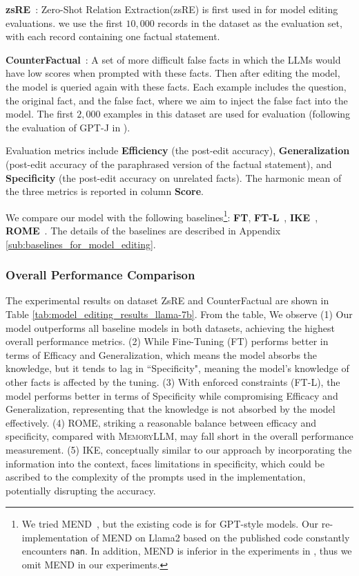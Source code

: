 \documentclass{article}
\theoremstyle{plain}
\theoremstyle{definition}
\theoremstyle{remark}
\newcommand{\ours}{\textsc{MemoryLLM}\xspace}
\begin{document}
\textbf{zsRE}~\citep{zsre}: Zero-Shot Relation Extraction(zsRE) is first used in \citet{mend, KE} for model editing evaluations.  we use the first $10,000$ records in the dataset as the evaluation set, with each record containing one factual statement. 

\textbf{CounterFactual}~\citep{ROME}: A set of more difficult false facts in which the LLMs would have low scores when prompted with these facts. Then after editing the model, the model is queried again with these facts. Each example includes the question, the original fact, and the false fact, where we aim to inject the false fact into the model. The first $2,000$ examples in this dataset are used for evaluation (following the evaluation of GPT-J in \cite{ROME}). 

Evaluation metrics include \textbf{Efficiency} (the post-edit accuracy), \textbf{Generalization} (post-edit accuracy of the paraphrased version of the factual statement), and \textbf{Specificity} (the post-edit accuracy on unrelated facts). The harmonic mean of the three metrics is reported in column \textbf{ Score}. 

We compare our model with the following baselines\footnote{We tried MEND~\citep{mend}, but the existing code is for GPT-style models. Our re-implementation of MEND on Llama2 based on the published code constantly encounters \texttt{nan}. In addition, MEND is inferior in the experiments in \cite{ROME}, thus we omit MEND in our experiments. }:
\textbf{FT}, \textbf{FT-L}~\citep{ModifyingMemories}, \textbf{IKE}~\citep{ike}, \textbf{ROME}~\citep{ROME}. The details of the baselines are described in Appendix \ref{sub:baselines_for_model_editing}. 







\vspace{-5pt}
\subsubsection{Overall Performance Comparison}
The experimental results on dataset ZsRE and CounterFactual are shown in
Table \ref{tab:model_editing_results_llama-7b}. From the table, 
We observe (1) 
Our model outperforms all baseline models in both datasets, achieving the highest overall performance metrics. 
(2) While Fine-Tuning (FT) 
performs better in terms of Efficacy and Generalization, which means the model absorbs the knowledge, but it tends to lag in ``Specificity", meaning the model's knowledge of other facts is affected by the tuning.
(3) With enforced constraints (FT-L), 
the model performs better in terms of Specificity while compromising Efficacy and Generalization, representing that the knowledge is not absorbed by the model effectively.
(4) ROME, striking a reasonable balance between efficacy and specificity, compared with \ours, may fall short in the overall performance measurement. 
(5) IKE, conceptually similar to our approach by incorporating the information into the context, faces limitations in specificity, which could be ascribed to the complexity of the prompts used in the implementation, potentially disrupting the accuracy. 
\end{document}
